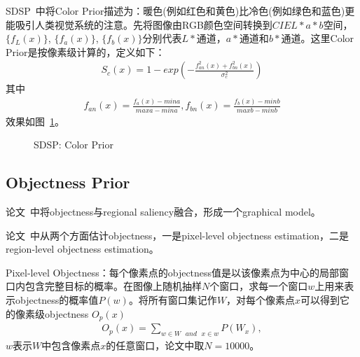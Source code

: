 \documentclass[12pt]{article}
\begin{document}
SDSP~\cite{zhang2013sdsp}中将Color Prior描述为：暖色(例如红色和黄色)比冷色(例如绿色和蓝色)更能吸引人类视觉系统的注意。先将图像由RGB颜色空间转换到$CIEL*a*b$空间，$\{ f_L(x)\}$, $\{ f_a(x)\}$, $\{ f_b(x)\}$分别代表$L*$通道，$a*$通道和$b*$通道。这里Color Prior是按像素级计算的，定义如下：
\begin{align}
S_c(x) = 1-exp\left(-\frac{f_{an}^2(x)+f_{bn}^2(x)}{\sigma_c^2}\right)
\end{align}
其中
\begin{align}
f_{an}(x)=\frac{f_a(x)-mina}{maxa-mina}, f_{bn}(x) = \frac{f_b(x)-minb}{maxb-minb}
\end{align}
效果如图~\ref{fig: SDSPColorPrior}。
\begin{figure}
  \centering 
  \caption{SDSP: Color Prior}
  \label{fig: SDSPColorPrior} %
\end{figure}

\subsection{Objectness Prior}

论文~\cite{chang2011fusing}中将objectness与regional saliency融合，形成一个graphical model。

论文~\cite{jiangpeng2013salient}中从两个方面估计objectness，一是pixel-level objectness estimation，二是region-level objectness estimation。

Pixel-level Objectness：每个像素点的objectness值是以该像素点为中心的局部窗口内包含完整目标的概率。在图像上随机抽样$N$个窗口，求每一个窗口$w$上用来表示objectness的概率值$P(w)$。将所有窗口集记作$W$，对每个像素点$x$可以得到它的像素级objectness $O_p(x)$
\begin{align}
O_p(x) = \sum_{w \in W \text{ }and \text{ } x \in w} P(W_x),
\end{align}
$w$表示$W$中包含像素点$x$的任意窗口，论文中取$N=10000$。
\end{document}
